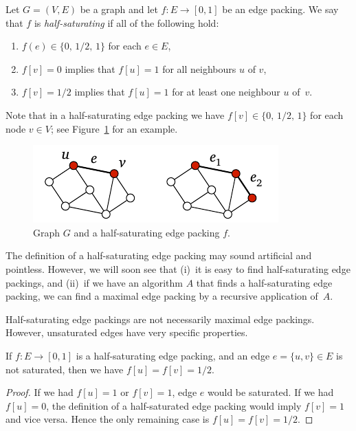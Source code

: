 Let $G = (V,E)$ be a graph and let $f\colon E \to [0,1]$ be an edge packing. We say that $f$ is \emph{half-saturating} if all of the following hold:
\begin{enumerate}
    \item $f(e) \in \{0,\, 1/2,\, 1\}$ for each $e \in E$,
    \item $f[v] = 0$ implies that $f[u] = 1$ for all neighbours $u$ of $v$,
    \item $f[v] = 1/2$ implies that $f[u] = 1$ for at least one neighbour $u$ of~$v$.
\end{enumerate}
Note that in a half-saturating edge packing we have $f[v] \in \{0,\, 1/2,\, 1\}$ for each node $v \in V$; see Figure~\ref{fig:half-saturating} for an example.

\begin{figure}
    \centering
    \includegraphics[page=\PHalfSaturating]{figs.pdf}
    \caption{Graph $G$ and a half-saturating edge packing $f$.}\label{fig:half-saturating}
\end{figure}

The definition of a half-saturating edge packing may sound artificial and pointless. However, we will soon see that (i)~it is easy to find half-saturating edge packings, and (ii)~if we have an algorithm $A$ that finds a half-saturating edge packing, we can find a maximal edge packing by a recursive application of~$A$.

Half-saturating edge packings are not necessarily maximal edge packings. However, unsaturated edges have very specific properties.

\begin{lemma}\label{lem:half-sat-edge}
    If $f\colon E \to [0,1]$ is a half-saturating edge packing, and an edge $e = \{u,v\} \in E$ is not saturated, then we have $f[u] = f[v] = 1/2$.
\end{lemma}
\begin{proof}
    If we had $f[u] = 1$ or $f[v] = 1$, edge $e$ would be saturated. If we had $f[u] = 0$, the definition of a half-saturated edge packing would imply $f[v] = 1$ and vice versa. Hence the only remaining case is $f[u] = f[v] = 1/2$.
\end{proof}

